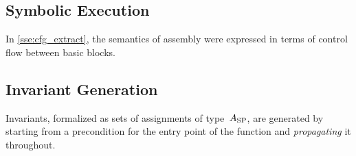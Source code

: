 
\subsection{Symbolic Execution}\label{sse:syntax_symb}
In \cref{sse:cfg_extract}, the semantics of assembly were expressed
in terms of control flow between basic blocks.

\subsection{Invariant Generation}\label{sse:inv_gen}
Invariants, formalized as sets of assignments of type~$A_\mathrm{SP}$,%
%
are generated by starting from a precondition for the entry point of the function%
and \emph{propagating} it throughout.%

